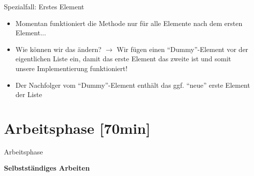 \documentclass{../tuda-beamer}
\begin{document}
    \begin{frame}{Spezialfall: Erstes Element}
        \begin{itemize}
            \item Momentan funktioniert die Methode nur für alle Elemente nach dem ersten Element...
            \item Wie können wir das ändern? \(\rightarrow\) Wir fügen einen
            \enquote{Dummy}-Element vor der eigentlichen Liste ein, damit das erste Element das
            zweite ist und somit unsere Implementierung funktioniert!
            \item Der Nachfolger vom \enquote{Dummy}-Element enthält das ggf. \enquote{neue}
            erste Element der Liste
        \end{itemize}
    \end{frame}

    \begin{frame}[allowframebreaks]
        
    \end{frame}


    \section{Arbeitsphase [70min]}
    \label{sec:arbeitsphase}
    \begin{frame}[c]{Arbeitsphase}
        \begin{center}
            \textbf{\LARGE Selbstständiges Arbeiten}
        \end{center}
    \end{frame}
\end{document}
